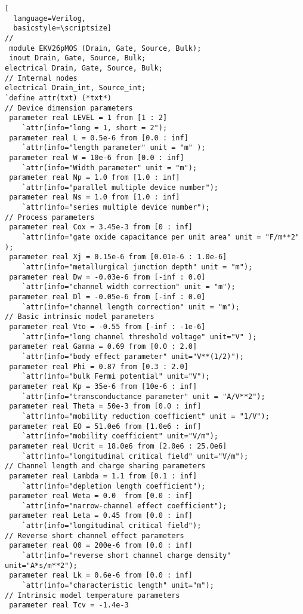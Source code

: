 \begin{lstlisting}[
  language=Verilog,
  basicstyle=\scriptsize]
// 
 module EKV26pMOS (Drain, Gate, Source, Bulk);
 inout Drain, Gate, Source, Bulk;
electrical Drain, Gate, Source, Bulk;
// Internal nodes
electrical Drain_int, Source_int;
`define attr(txt) (*txt*)
// Device dimension parameters
 parameter real LEVEL = 1 from [1 : 2]  
	`attr(info="long = 1, short = 2");
 parameter real L = 0.5e-6 from [0.0 : inf]  
	`attr(info="length parameter" unit = "m" );
 parameter real W = 10e-6 from [0.0 : inf]  
	`attr(info="Width parameter" unit = "m"); 
 parameter real Np = 1.0 from [1.0 : inf]   
	`attr(info="parallel multiple device number");
 parameter real Ns = 1.0 from [1.0 : inf] 
	`attr(info="series multiple device number"); 
// Process parameters
 parameter real Cox = 3.45e-3 from [0 : inf]         
	`attr(info="gate oxide capacitance per unit area" unit = "F/m**2" );
 parameter real Xj = 0.15e-6 from [0.01e-6 : 1.0e-6] 
	`attr(info="metallurgical junction depth" unit = "m");
 parameter real Dw = -0.03e-6 from [-inf : 0.0]      
	`attr(info="channel width correction" unit = "m");
 parameter real Dl = -0.05e-6 from [-inf : 0.0]       
	`attr(info="channel length correction" unit = "m");
// Basic intrinsic model parameters
 parameter real Vto = -0.55 from [-inf : -1e-6]     
	`attr(info="long channel threshold voltage" unit="V" );
 parameter real Gamma = 0.69 from [0.0 : 2.0]       
	`attr(info="body effect parameter" unit="V**(1/2)");
 parameter real Phi = 0.87 from [0.3 : 2.0]         
	`attr(info="bulk Fermi potential" unit="V");
 parameter real Kp = 35e-6 from [10e-6 : inf]      
	`attr(info="transconductance parameter" unit = "A/V**2");
 parameter real Theta = 50e-3 from [0.0 : inf]      
	`attr(info="mobility reduction coefficient" unit = "1/V");
 parameter real EO = 51.0e6 from [1.0e6 : inf]      
	`attr(info="mobility coefficient" unit="V/m");
 parameter real Ucrit = 18.0e6 from [2.0e6 : 25.0e6] 
	`attr(info="longitudinal critical field" unit="V/m");
// Channel length and charge sharing parameters
 parameter real Lambda = 1.1 from [0.1 : inf]      
	`attr(info="depletion length coefficient");
 parameter real Weta = 0.0  from [0.0 : inf]        
	`attr(info="narrow-channel effect coefficient");
 parameter real Leta = 0.45 from [0.0 : inf]        
	`attr(info="longitudinal critical field");
// Reverse short channel effect parameters
 parameter real Q0 = 200e-6 from [0.0 : inf]        
	`attr(info="reverse short channel charge density" unit="A*s/m**2");
 parameter real Lk = 0.6e-6 from [0.0 : inf]        
	`attr(info="characteristic length" unit="m");
// Intrinsic model temperature parameters
 parameter real Tcv = -1.4e-3   

\end{lstlisting}
